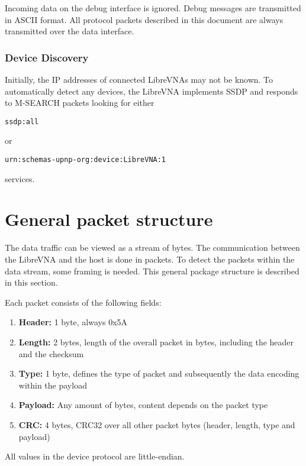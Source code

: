 \documentclass[a4paper,11pt]{article}
\begin{document}
Incoming data on the debug interface is ignored. Debug messages are transmitted in ASCII format. All protocol packets described in this document are always transmitted over the data interface.

\subsubsection{Device Discovery}
Initially, the IP addresses of connected LibreVNAs may not be known. To automatically detect any devices, the LibreVNA implements SSDP and responds to M-SEARCH packets looking for either
\begin{lstlisting}
ssdp:all
\end{lstlisting}
or
\begin{lstlisting}
urn:schemas-upnp-org:device:LibreVNA:1
\end{lstlisting}
services.


\section{General packet structure}
The data traffic can be viewed as a stream of bytes. The communication between the LibreVNA and the host is done in packets. To detect the packets within the data stream, some framing is needed. This general package structure is described in this section.

Each packet consists of the following fields:
\begin{enumerate}
\item \textbf{Header:} 1 byte, always 0x5A
\item \textbf{Length:} 2 bytes, length of the overall packet in bytes, including the header and the checksum
\item \textbf{Type:} 1 byte, defines the type of packet and subsequently the data encoding within the payload
\item \textbf{Payload:} Any amount of bytes, content depends on the packet type
\item \textbf{CRC:} 4 bytes, CRC32 over all other packet bytes (header, length, type and payload)
\end{enumerate}
\noindent
All values in the device protocol are little-endian.
\end{document}
